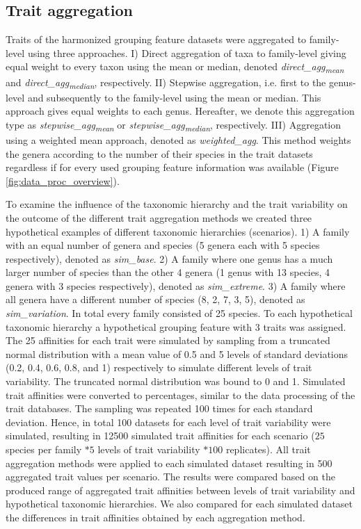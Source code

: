 \documentclass{article}
\begin{document}
\newpage

\subsection*{Trait aggregation}

Traits of the harmonized grouping feature datasets were aggregated to family-level using three approaches. I) Direct aggregation of taxa to family-level giving equal weight to every taxon using the mean or median, denoted \textit{direct\_agg\textsubscript{mean}} and \textit{direct\_agg\textsubscript{median}}, respectively. II) Stepwise aggregation, i.e. first to the genus-level and subsequently to the family-level using the mean or median. This approach gives equal weights to each genus. Hereafter, we denote this aggregation type as \textit{stepwise\_agg\textsubscript{mean}} or \textit{stepwise\_agg\textsubscript{median}}, respectively. III) Aggregation using a weighted mean approach, denoted as \textit{weighted\_agg}. This method weights the genera according to the number of their species in the trait datasets regardless if for every used grouping feature information was available (Figure \ref{fig:data_proc_overview}). 

To examine the influence of the taxonomic hierarchy and the trait variability on the outcome of the different trait aggregation methods we created three hypothetical examples of different taxonomic hierarchies (scenarios). 
1) A family with an equal number of genera and species (5 genera each with 5 species respectively), denoted as \textit{sim\_base}.
2) A family where one genus has a much larger number of species than the other 4 genera (1 genus with 13 species, 4 genera with 3 species respectively), denoted as \textit{sim\_extreme}. 
3) A family where all genera have a different number of species (8, 2, 7, 3, 5), denoted as \textit{sim\_variation}. In total every family consisted of 25 species. To each hypothetical taxonomic hierarchy a hypothetical grouping feature with 3 traits was assigned. The 25 affinities for each trait were simulated by sampling from a truncated normal distribution with a mean value of 0.5 and 5 levels of standard deviations (0.2, 0.4, 0.6, 0.8, and 1) respectively to simulate different levels of trait variability. The truncated normal distribution was bound to 0 and 1. Simulated trait affinities were converted to percentages, similar to the data processing of the trait databases. The sampling was repeated 100 times for each standard deviation. Hence, in total 100 datasets for each level of trait variability were simulated, resulting in 12500 simulated trait affinities for each scenario ($25$ species per family $* 5$ levels of trait variability $* 100$ replicates). All trait aggregation methods were applied to each simulated dataset resulting in 500 aggregated trait values per scenario. The results were compared based on the produced range of aggregated trait affinities between levels of trait variability and hypothetical taxonomic hierarchies. We also compared for each simulated dataset the differences in trait affinities obtained by each aggregation method.  
\end{document}
